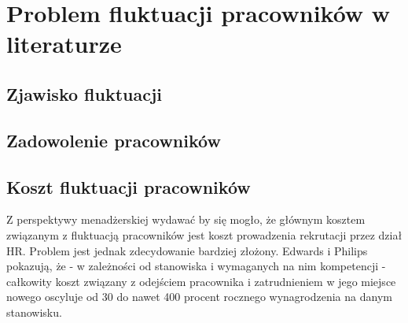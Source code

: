 

\chapter{Problem fluktuacji pracowników w literaturze}\label{ch:knowladge-state}


\section{Zjawisko fluktuacji}\label{sec:employee-turnover}


\section{Zadowolenie pracowników}\label{sec:employee-happiness}


\section{Koszt fluktuacji pracowników}\label{sec:employee-selection}

Z perspektywy menadżerskiej wydawać by się mogło, że głównym kosztem związanym z fluktuacją pracowników jest koszt prowadzenia rekrutacji przez dział HR.
Problem jest jednak zdecydowanie bardziej złożony.
Edwards i Philips\cite{philips-edwards-2009} pokazują, że - w zależności od stanowiska i wymaganych na nim kompetencji -
całkowity koszt związany z odejściem pracownika i zatrudnieniem w jego miejsce nowego oscyluje od 30 do nawet 400 procent
rocznego wynagrodzenia na danym stanowisku.

